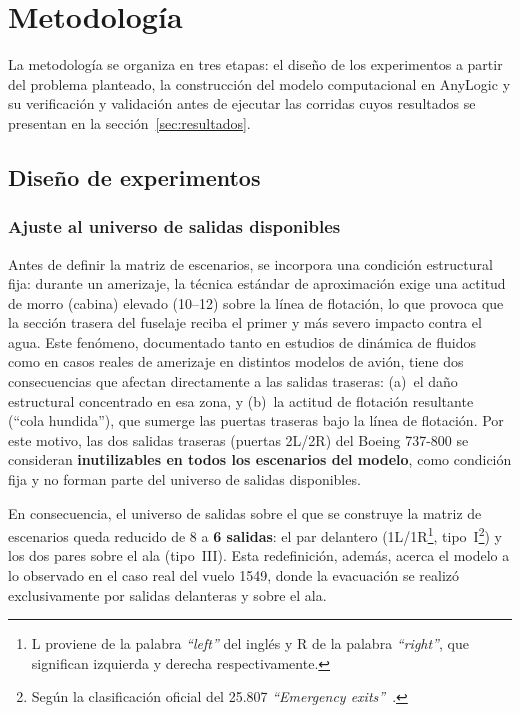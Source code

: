 \documentclass[a4paper, 11pt]{article}
\begin{document}
\section{Metodolog\'ia}\label{sec:metodologia}

La metodolog\'ia se organiza en tres etapas: el dise\~no de los experimentos a
partir del problema planteado, la construcci\'on del modelo computacional en
AnyLogic y su verificaci\'on y validaci\'on antes de ejecutar las corridas cuyos
resultados se presentan en la secci\'on~\ref{sec:resultados}.

\subsection{Dise\~no de experimentos}\label{sec:diseno}

\subsubsection{Ajuste al universo de salidas disponibles}\label{sub:ajuste}

Antes de definir la matriz de escenarios, se incorpora una condici\'on estructural
fija: durante un amerizaje, la t\'ecnica est\'andar de aproximaci\'on exige una
actitud de morro (cabina) elevado (10\textdegree--12\textdegree) sobre la l\'inea de
flotaci\'on, lo que provoca que la secci\'on trasera del fuselaje reciba el primer y
m\'as severo impacto contra el agua. Este fen\'omeno, documentado tanto en estudios
de din\'amica de fluidos como en casos reales de amerizaje en distintos modelos de
avi\'on, tiene dos consecuencias que afectan directamente a las salidas traseras:
(a)~el da\~no estructural concentrado en esa zona, y (b)~la actitud de flotaci\'on
resultante (``cola hundida''), que sumerge las puertas traseras bajo la l\'inea de
flotaci\'on. Por este motivo, las dos salidas traseras (puertas 2L/2R) del Boeing
737-800 se consideran \textbf{inutilizables en todos los escenarios del modelo},
como condici\'on fija y no forman parte del universo de salidas disponibles.

En consecuencia, el universo de salidas sobre el que se construye la matriz de
escenarios queda reducido de 8 a \textbf{6 salidas}: el par delantero
(1L/1R\footnote{L proviene de la palabra \textit{``left''} del ingl\'es y R de la
palabra \textit{``right''}, que significan izquierda y derecha respectivamente.},
tipo~I\footnote{Seg\'un la clasificaci\'on oficial del 25.807 \textit{``Emergency
exits''}~\cite{cfr25807}.}) y los dos pares sobre el ala (tipo~III). Esta
redefinici\'on, adem\'as, acerca el modelo a lo observado en el caso real del vuelo
1549, donde la evacuaci\'on se realiz\'o exclusivamente por salidas delanteras y
sobre el ala.
\end{document}
